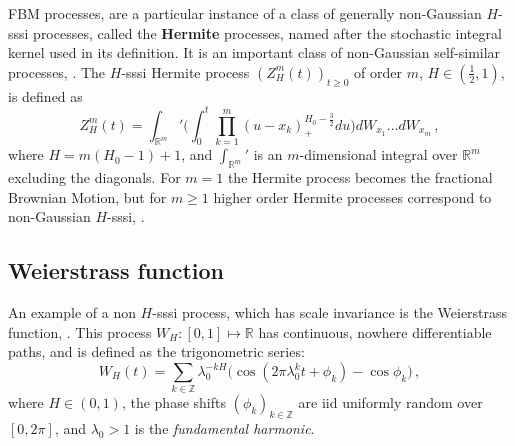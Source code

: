 \documentclass[a4paper]{article}
\newcommand{\Real}{\mathbb{R}}
\begin{document}
FBM processes, are a particular instance of a class of generally non-Gaussian $H$-sssi
processes, called the \textbf{Hermite} processes, named after the stochastic integral
kernel used in its definition. It is an important class of non-Gaussian self-similar
processes, \cite{maejima2007}. The $H$-sssi Hermite process $(Z_H^m(t))_{t\geq 0}$
of order $m$, $H \in (\frac{1}{2}, 1)$, is defined as %
\begin{equation}\label{eq:def_hermite}
    Z_H^m(t) = \int_{\Real^m}' \Biggl(
            \int_0^t \prod_{k=1}^m (u - x_k)_+^{H_0-\frac{3}{2}} du
        \Biggr) dW_{x_1} \ldots dW_{x_m}\,,
\end{equation}
where $H = m (H_0-1)+1$, and $\int_{\Real^m}'$ is an $m$-dimensional integral over
$\Real^m$ excluding the diagonals. For $m=1$ the Hermite process becomes the fractional
Brownian Motion, but for $m\geq 1$ higher order Hermite processes correspond to
non-Gaussian $H$-sssi, \cite{Bai20141710,Chronopoulou:1114288,embrechts2000introduction}.


\subsection{Weierstrass function} %
\label{sub:weierstrass_function}

An example of a non $H$-sssi process, which has scale invariance is the Weierstrass
function, \cite{decrouez2013}. This process $W_H:[0,1] \mapsto \Real$ has continuous,
nowhere differentiable paths, and is defined as the trigonometric series:
\begin{equation} \label{eq:def_weir}
    W_H(t) = \sum_{k\in \mathbb{Z}} \lambda_0^{-k H} \bigl(
            \cos(2\pi \lambda_0^k t + \phi_k) - \cos \phi_k
        \bigr) \,,
\end{equation}
where $H\in(0, 1)$, the phase shifts $(\phi_k)_{k\in\mathbb{Z}}$ are iid uniformly
random over $[0, 2\pi]$, and $\lambda_0 > 1$ is the \emph{fundamental harmonic}.
\end{document}
